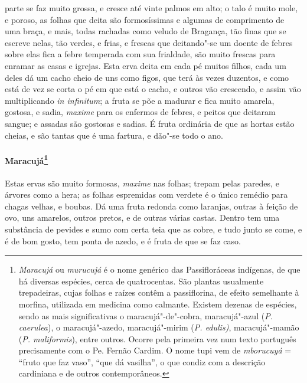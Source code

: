 parte se faz muito grossa, e cresce até vinte palmos em alto; o talo é
muito mole, e poroso, as folhas que deita são formosíssimas e algumas
de comprimento de uma braça, e mais, todas rachadas como veludo de
Bragança, tão finas que se escreve nelas, tão verdes, e frias, e
frescas que deitando"-se um doente de febres sobre elas fica a febre
temperada com sua frialdade, são muito frescas para enramar as casas e
igrejas. Esta erva deita em cada pé muitos filhos, cada um deles dá um
cacho cheio de uns como figos, que terá às vezes duzentos, e como está
de vez se corta o pé em que está o cacho, e outros vão crescendo, e
assim vão multiplicando \textit{in infinitum}; a fruta se põe a madurar e fica
muito amarela, gostosa, e sadia, \textit{maxime} para os enfermos de febres, e
peitos que deitaram sangue; e assadas são gostosas e sadias. É fruta
ordinária de que as hortas estão cheias, e são tantas que é uma
fartura, e dão"-se todo o ano.

\paragraph{Maracujá\footnote{ \textit{Maracujá} ou \textit{murucujá} 
é o nome genérico das Passifloráceas indígenas, de que há diversas
espécies, cerca de quatrocentas. São plantas usualmente trepadeiras,
cujas folhas e raízes contêm a passiflorina, de efeito semelhante à
morfina, utilizada em medicina como calmante. Existem dezenas de
espécies, sendo as mais significativas o maracujá"-de"-cobra,
maracujá"-azul (\textit{P. caerulea}), o maracujá"-azedo, maracujá"-mirim
(\textit{P. edulis)}, maracujá"-mamão (\textit{P. maliformis}), entre
outros. Ocorre pela primeira vez num texto português precisamente com o
Pe. Fernão Cardim. O nome tupi vem de \textit{mborucuyá} = ``fruto que
faz vaso'', ``que dá vasilha'', o que condiz com a descrição cardiniana e
de outros contemporâneos.}} Estas ervas são muito formosas,
\textit{maxime} nas folhas; trepam pelas paredes, e árvores como a hera; as
folhas espremidas com verdete é o único remédio para chagas velhas, e
boubas. Dá uma fruta redonda como laranjas, outras à feição de ovo, uns
amarelos, outros pretos, e de outras várias castas. Dentro tem uma
substância de pevides e sumo com certa teia que as cobre, e tudo junto
se come, e é de bom gosto, tem ponta de azedo, e é fruta de que se faz caso.


